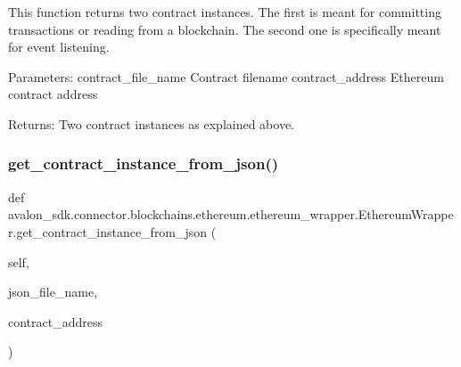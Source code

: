 \begin{DoxyVerb}This function returns two contract instances.
The first is meant for committing transactions or reading from
a blockchain.
The second one is specifically meant for event listening.

Parameters:
contract_file_name  Contract filename
contract_address    Ethereum contract address

Returns:
Two contract instances as explained above.
\end{DoxyVerb}
 \mbox{\label{classavalon__sdk_1_1connector_1_1blockchains_1_1ethereum_1_1ethereum__wrapper_1_1EthereumWrapper_aaacb356300dea555bd7d2c499e4a176f}} 
\subsubsection{\texorpdfstring{get\+\_\+contract\+\_\+instance\+\_\+from\+\_\+json()}{get\_contract\_instance\_from\_json()}}
{\footnotesize\ttfamily def avalon\+\_\+sdk.\+connector.\+blockchains.\+ethereum.\+ethereum\+\_\+wrapper.\+Ethereum\+Wrapper.\+get\+\_\+contract\+\_\+instance\+\_\+from\+\_\+json (\begin{DoxyParamCaption}\item[{}]{self,  }\item[{}]{json\+\_\+file\+\_\+name,  }\item[{}]{contract\+\_\+address }\end{DoxyParamCaption})}

